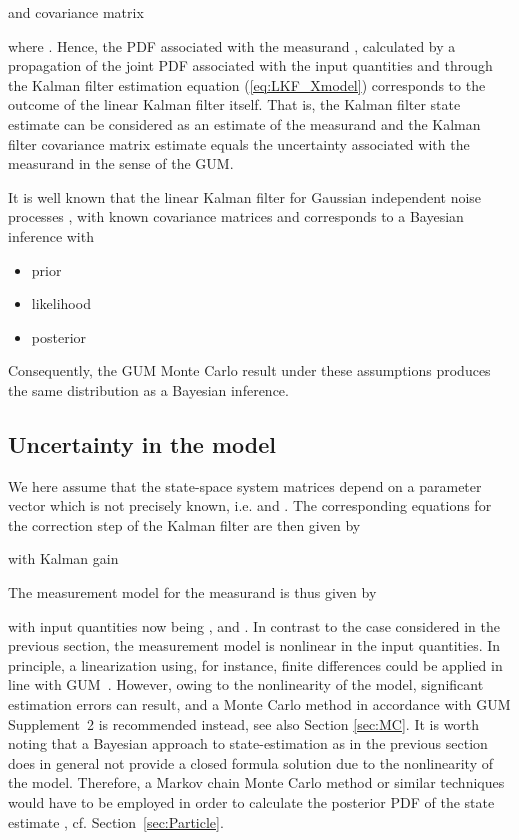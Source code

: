 \documentclass[10pt]{article}
\begin{document}
\begin{spacing}{1}
and covariance matrix

where .
Hence, the PDF associated with the measurand , calculated by a propagation of the joint PDF associated with the input quantities  and  through the Kalman filter estimation equation (\ref{eq:LKF_Xmodel}) corresponds to the outcome of the linear Kalman filter itself. That is, the Kalman filter state estimate  can be considered as an estimate of the measurand and the Kalman filter covariance matrix estimate  equals the uncertainty associated with the measurand in the sense of the GUM.

It is well known that the linear Kalman filter for Gaussian independent noise processes ,  with known covariance matrices  and  corresponds to a Bayesian inference \cite{Candy} with 
\begin{itemize}
 \item prior
 
 \item likelihood
 
 \item posterior
  
\end{itemize}

Consequently, the GUM Monte Carlo result under these assumptions produces the same distribution as a Bayesian inference.

\subsection{Uncertainty in the model}
\label{sec:LKF_uncertain}
We here assume that the state-space system matrices depend on a parameter vector  which is not precisely known, i.e.  and . The corresponding equations for the correction step of the Kalman filter are then given by

with Kalman gain

The measurement model for the measurand  is thus given by

with input quantities now being ,  and . In contrast to the case considered in the previous section, the measurement model is nonlinear in the input quantities. In principle, a linearization using, for instance, finite differences could be applied in line with GUM~\cite{GUM}. However, owing to the nonlinearity of the model, significant estimation errors can result, and a Monte Carlo method in accordance with GUM Supplement~2 \cite{GUMS2} is recommended instead, see also Section \ref{sec:MC}. It is worth noting that a Bayesian approach to state-estimation as in the previous section does in general not provide a closed formula solution due to the nonlinearity of the model. Therefore, a Markov chain Monte Carlo method or similar techniques would have to be employed in order to calculate the posterior PDF of the state estimate , cf. Section~\ref{sec:Particle}.


\end{spacing}
\end{document}
